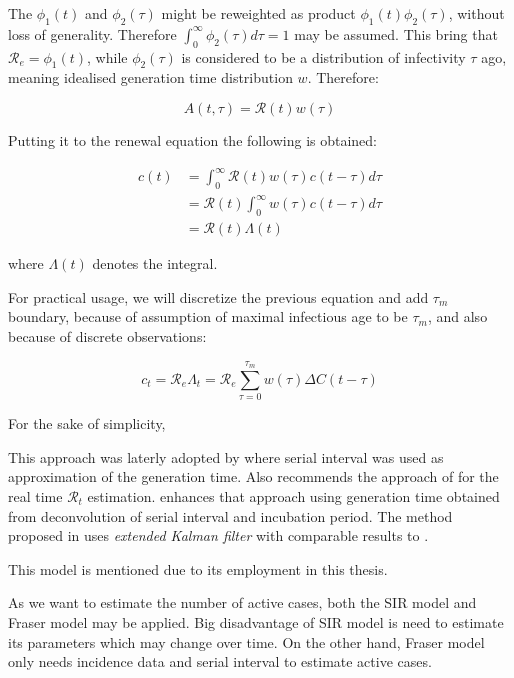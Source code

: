 \documentclass[
  digital, %
  oneside, %
  lof,     %
  lot,     %
]{fithesis4}
\begin{document}
The $\phi_1(t)$ and $\phi_2(\tau)$ might be reweighted as 
product $\phi_1(t) \phi_2(\tau)$, without loss of generality. 
Therefore $\int^{\infty}_0 \phi_2(\tau) d\tau = 1$ may be assumed. 
This bring that $\mathcal{R}_e = \phi_1(t)$, while $\phi_2(\tau)$ 
is considered to be a distribution of infectivity $\tau$ ago, 
meaning idealised generation time distribution $w$. 
Therefore:

\begin{equation}
A(t, \tau) = \mathcal{R}(t) w(\tau)
\end{equation}

Putting it to the renewal equation the following is obtained:

\begin{equation}
  \begin{split}
    c(t) & = \int^{\infty}_0 \mathcal{R}(t) w(\tau) c(t - \tau) d\tau \\
    & = \mathcal{R}(t) \int^{\infty}_0 w(\tau) c(t - \tau) d\tau\\
    & = \mathcal{R}(t) \Lambda(t)    
  \end{split}
\end{equation}

where $\Lambda(t)$ denotes the integral.

For practical usage, we will discretize the previous equation 
and add $\tau_m$ boundary, because of assumption of maximal 
infectious age to be $\tau_m$, and also because of discrete 
observations:

\begin{equation}
c_t = \mathcal{R}_e \Lambda_t = \mathcal{R}_e \sum^{\tau_m}_{\tau=0} w(\tau) \Delta C(t - \tau)
\end{equation}

For the sake of simplicity, 

This approach was laterly adopted by \cite{cori2013} where serial 
interval was used as approximation of the generation time.
Also \cite{gostic2020} recommends the approach of \cite{cori2013} 
for the real time $\mathcal{R}_t$ estimation. \cite{knight2020} 
enhances that approach using generation time obtained from 
deconvolution of serial interval and incubation period. 
The method proposed in \cite{hasan2020} uses 
\textit{extended Kalman filter} with comparable results 
to \cite{cori2013}.

This model is mentioned due to its employment in this thesis.

As we want to estimate the number of active cases, both the 
SIR model and Fraser model may be applied. 
Big disadvantage of SIR model is need to estimate its 
parameters which may change over time. 
On the other hand, Fraser model only needs incidence 
data and serial interval to estimate active cases.
\end{document}

